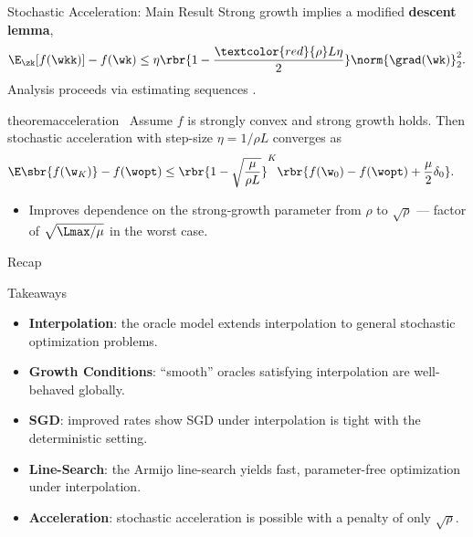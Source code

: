 \documentclass[mathserif,notheorems, hyperref={colorlinks, citecolor=blue, urlcolor=blue, linkcolor=blue}]{beamer}
\begin{document}
\begin{frame}{Stochastic Acceleration: Main Result}
	Strong growth implies a modified \textbf{descent lemma},
	\[
		\E_{\zk}[f(\wkk)] - f(\wk) \leq \eta \rbr{1 - \frac{\textcolor{red}{\rho} L \eta}{2}} \norm{\grad(\wk)}_2^2.
	\]
	Analysis proceeds via estimating sequences \citep{nesterov2018lectures}.

	\pause

	\begin{restatable}[Acceleration]{theorem}{acceleration}~\label{thm:acceleration}
		Assume \( f \) is strongly convex and strong growth holds.
		Then stochastic acceleration with step-size \( \eta  = 1 / \rho L \) converges as
		\begin{align*}
			\E\sbr{f(\w_K)} - f(\wopt) & \leq \rbr{1 - \sqrt{\frac{\mu}{\rho L}}}^K\rbr{f(\w_0) - f(\wopt) + \frac{\mu}{2} \delta_0}.
		\end{align*}
	\end{restatable}

	\pause

	\begin{itemize}
		\item Improves dependence on the strong-growth parameter from \( \rho \) to \( \sqrt{\rho} \) --- factor of \( \sqrt{\Lmax / \mu} \) in the worst case.
		      \vspace{1ex}
	\end{itemize}

\end{frame}


\begin{frame}{Recap}
	\begin{center}
		\vspace{-2ex}
		\Large Takeaways
		\vspace{1ex}
	\end{center}

	\begin{itemize}
		\item \textbf{Interpolation}: the oracle model extends interpolation to general stochastic optimization problems.
		      \vspace{1ex}
		      \pause
		\item \textbf{Growth Conditions}: ``smooth'' oracles satisfying interpolation are well-behaved globally.
		      \vspace{1ex}
		      \pause
		\item \textbf{SGD}: improved rates show SGD under interpolation is tight with the deterministic setting.
		      \vspace{1ex}
		      \pause
		\item \textbf{Line-Search}: the Armijo line-search yields fast, parameter-free optimization under interpolation.
		      \vspace{1ex}
		      \pause
		\item \textbf{Acceleration}: stochastic acceleration is possible with a penalty of only \( \sqrt{\rho} \).
	\end{itemize}
\end{frame}
\end{document}
